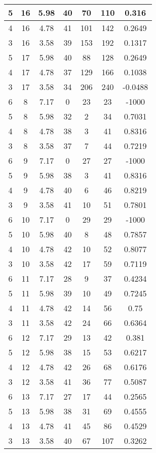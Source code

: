 \documentclass[letterpaper, 12pt]{article}
\begin{document}
\begin{longtable}{|c|c|c|c|c|c|c|}
\hline
5 & 16 & 5.98 & 40 & 70 & 110 & 0.316 \\
\hline
4 & 16 & 4.78 & 41 & 101 & 142 & 0.2649 \\
\hline
3 & 16 & 3.58 & 39 & 153 & 192 & 0.1317 \\
\hline
5 & 17 & 5.98 & 40 & 88 & 128 & 0.2649 \\
\hline
4 & 17 & 4.78 & 37 & 129 & 166 & 0.1038 \\
\hline
3 & 17 & 3.58 & 34 & 206 & 240 & -0.0488 \\
\hline
6 & 8 & 7.17 & 0 & 23 & 23 & -1000 \\
\hline
5 & 8 & 5.98 & 32 & 2 & 34 & 0.7031 \\
\hline
4 & 8 & 4.78 & 38 & 3 & 41 & 0.8316 \\
\hline
3 & 8 & 3.58 & 37 & 7 & 44 & 0.7219 \\
\hline
6 & 9 & 7.17 & 0 & 27 & 27 & -1000 \\
\hline
5 & 9 & 5.98 & 38 & 3 & 41 & 0.8316 \\
\hline
4 & 9 & 4.78 & 40 & 6 & 46 & 0.8219 \\
\hline
3 & 9 & 3.58 & 41 & 10 & 51 & 0.7801 \\
\hline
6 & 10 & 7.17 & 0 & 29 & 29 & -1000 \\
\hline
5 & 10 & 5.98 & 40 & 8 & 48 & 0.7857 \\
\hline
4 & 10 & 4.78 & 42 & 10 & 52 & 0.8077 \\
\hline
3 & 10 & 3.58 & 42 & 17 & 59 & 0.7119 \\
\hline
6 & 11 & 7.17 & 28 & 9 & 37 & 0.4234 \\
\hline
5 & 11 & 5.98 & 39 & 10 & 49 & 0.7245 \\
\hline
4 & 11 & 4.78 & 42 & 14 & 56 & 0.75 \\
\hline
3 & 11 & 3.58 & 42 & 24 & 66 & 0.6364 \\
\hline
6 & 12 & 7.17 & 29 & 13 & 42 & 0.381 \\
\hline
5 & 12 & 5.98 & 38 & 15 & 53 & 0.6217 \\
\hline
4 & 12 & 4.78 & 42 & 26 & 68 & 0.6176 \\
\hline
3 & 12 & 3.58 & 41 & 36 & 77 & 0.5087 \\
\hline
6 & 13 & 7.17 & 27 & 17 & 44 & 0.2565 \\
\hline
5 & 13 & 5.98 & 38 & 31 & 69 & 0.4555 \\
\hline
4 & 13 & 4.78 & 41 & 45 & 86 & 0.4529 \\
\hline
3 & 13 & 3.58 & 40 & 67 & 107 & 0.3262 \\

\end{longtable}
\end{document}
